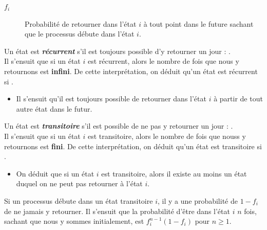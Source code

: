 \documentclass[10pt, french]{article}
\begin{document}
\begin{multicols*}{2}
\begin{distributions}[Notation]
\begin{description}
	\item[$f_{i}$]	Probabilité de retourner dans l'état $i$ à tout point dans le future sachant que le processus débute dans l'état $i$.
\end{description}
\end{distributions}

\begin{definitionNOHFILLprop}
Un état est \textbf{\textit{récurrent}} s'il est toujours possible d'y retourner un jour : . \\

Il s'ensuit que si un état $i$ est récurrent, alors le nombre de fois que nous y retournons est \textbf{infini}. De cette interprétation, on déduit qu'un état est récurrent si .

\begin{itemize}
	\item	Il s'ensuit qu'il est toujours possible de retourner dans l'état $i$ à partir de tout autre état dans le futur.
\end{itemize}	
\end{definitionNOHFILLprop}

\begin{definitionNOHFILLprop}
Un état est \textit{\textbf{transitoire}} s'il est possible de ne pas y retourner un jour : .\\

Il s'ensuit que si un état $i$ est transitoire, alors le nombre de fois que nouss y retournons est \textbf{fini}. De cette interprétation, on déduit qu'un état est transitoire si .

\begin{itemize}
	\item	On déduit que si un état $i$ est transitoire, alors il existe au moins un état duquel on ne peut pas retourner à l'état $i$. 
\end{itemize}

\begin{definitionNOHFILLpropos}
Si un processus débute dans un état transitoire $i$, il y a une probabilité de $1 - f_{i}$ de ne jamais y retourner. Il s'ensuit que la probabilité d'être dans l'état $i$ $n$ fois, sachant que nous y sommes initialement, est $f_{i}^{n - 1}(1 - f_{i})$ pour $n \geq 1$.	\\


\end{definitionNOHFILLpropos}
\end{definitionNOHFILLprop}
\end{multicols*}
\end{document}
